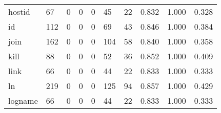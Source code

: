 \begin{longtable}{lp{2.0cm}p{2.0cm}p{2.0cm}p{2.0cm}p{2.0cm}p{2.0cm}p{2.0cm}p{2.0cm}p{2.0cm}}
hostid    &                     67 &                                             0 &                                            0 &                                           0 &                                           45 &                                         22 &                                0.832 &                                  1.000 &                                0.328 \\
id        &                    112 &                                             0 &                                            0 &                                           0 &                                           69 &                                         43 &                                0.846 &                                  1.000 &                                0.384 \\
join      &                    162 &                                             0 &                                            0 &                                           0 &                                          104 &                                         58 &                                0.840 &                                  1.000 &                                0.358 \\
kill      &                     88 &                                             0 &                                            0 &                                           0 &                                           52 &                                         36 &                                0.852 &                                  1.000 &                                0.409 \\
link      &                     66 &                                             0 &                                            0 &                                           0 &                                           44 &                                         22 &                                0.833 &                                  1.000 &                                0.333 \\
ln        &                    219 &                                             0 &                                            0 &                                           0 &                                          125 &                                         94 &                                0.857 &                                  1.000 &                                0.429 \\
logname   &                     66 &                                             0 &                                            0 &                                           0 &                                           44 &                                         22 &                                0.833 &                                  1.000 &                                0.333 \\

\end{longtable}
